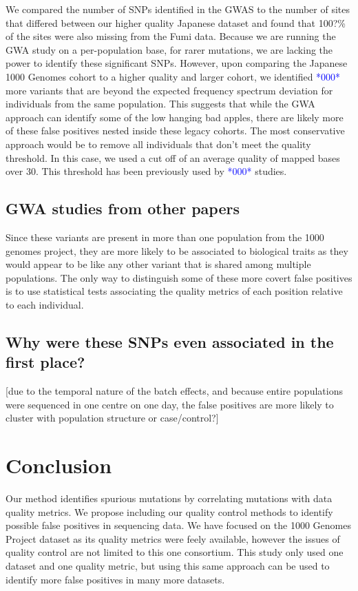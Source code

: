 \documentclass[12pt,twocolumn]{article}
\newcommand{\todo}[1]{\textcolor{blue}{*#1*}}
\begin{document}
We compared the number of SNPs identified in the GWAS to the number of sites that differed between our higher quality Japanese dataset and found that 100?\% of the sites were also missing from the Fumi data. 
Because we are running the GWA study on a per-population base, for rarer mutations, we are lacking the power to identify these significant SNPs.  
However, upon comparing the Japanese 1000 Genomes cohort to a higher quality and larger cohort, we identified \todo{000} more variants that are beyond the expected frequency spectrum deviation for individuals from the same population. 
This suggests that while the GWA approach can identify some of the low hanging bad apples, there are likely more of these false positives nested inside these legacy cohorts. 
The most conservative approach would be to remove all individuals that don't meet the quality threshold. 
In this case, we used a cut off of an average quality of mapped bases over 30. This threshold has been previously used by \todo{000} studies.

\subsection{GWA studies from other papers}
Since these variants are present in more than one population from the 1000 genomes project, they are more likely to be associated to biological traits as they would appear to be like any other variant that is shared among multiple populations. 
The only way to distinguish some of these more covert false positives is to use statistical tests associating the quality metrics of each position relative to each individual. 

\subsection{Why were these SNPs even associated in the first place?}
[due to the temporal nature of the batch effects, and because entire populations were sequenced in one centre on one day, the false positives are more likely to cluster with population structure or case/control?]

			\section{Conclusion}
Our method identifies spurious mutations by correlating mutations with data quality metrics. 
We propose including our quality control methods to identify possible false positives in sequencing data. 
We have focused on the 1000 Genomes Project dataset as its quality metrics were feely available, however the issues of quality control are not limited to this one consortium. 
This study only used one dataset and one quality metric, but using this same approach can be used to identify more false positives in many more datasets. 
\end{document}
